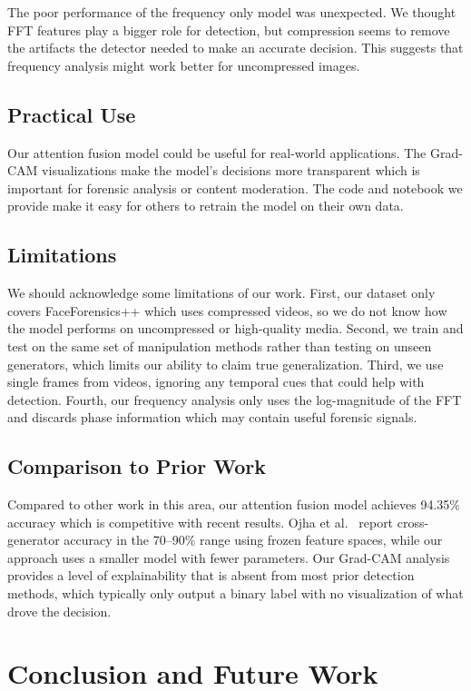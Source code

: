 \documentclass{article}
\begin{document}
The poor performance of the frequency only model was unexpected. We thought FFT features play a bigger role for detection, but compression seems to remove the artifacts the detector needed to make an accurate decision. This suggests that frequency analysis might work better for uncompressed images.

\subsection{Practical Use}

Our attention fusion model could be useful for real-world applications. The Grad-CAM visualizations make the model's decisions more transparent which is important for forensic analysis or content moderation. The code and notebook we provide make it easy for others to retrain the model on their own data.

\subsection{Limitations}

We should acknowledge some limitations of our work. First, our dataset only covers FaceForensics++ which uses compressed videos, so we do not know how the model performs on uncompressed or high-quality media. Second, we train and test on the same set of manipulation methods rather than testing on unseen generators, which limits our ability to claim true generalization. Third, we use single frames from videos, ignoring any temporal cues that could help with detection. Fourth, our frequency analysis only uses the log-magnitude of the FFT and discards phase information which may contain useful forensic signals.

\subsection{Comparison to Prior Work}

Compared to other work in this area, our attention fusion model achieves 94.35\% accuracy which is competitive with recent results. Ojha et al.~\cite{ojha2023universal} report cross-generator accuracy in the 70--90\% range using frozen feature spaces, while our approach uses a smaller model with fewer parameters. Our Grad-CAM analysis provides a level of explainability that is absent from most prior detection methods, which typically only output a binary label with no visualization of what drove the decision.

\section{Conclusion and Future Work}
\end{document}
